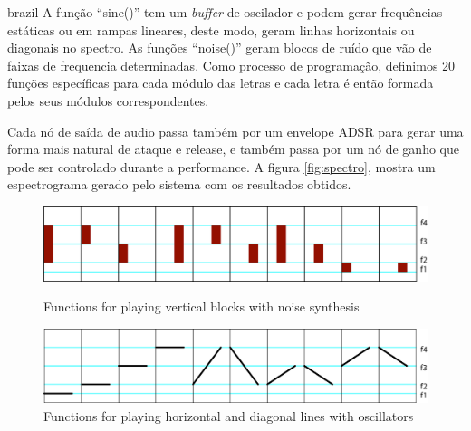 \begin{otherlanguage*}{brazil}
A função ``sine()'' tem um \emph{buffer} de oscilador e podem gerar frequências estáticas ou em rampas lineares, deste modo, geram linhas horizontais ou diagonais no spectro. As funções ``noise()'' geram blocos de ruído que vão de faixas de frequencia determinadas. Como processo de programação, definimos 20 funções específicas para cada módulo das letras e cada letra é então formada pelos seus módulos correspondentes. 






Cada nó de saída de audio passa também por um envelope ADSR \cite{Lee2016} para gerar uma forma mais natural de ataque e release, e também passa por um nó de ganho que pode ser controlado durante a performance. A figura \ref{fig:spectro}, mostra um espectrograma gerado pelo sistema com os resultados obtidos.


\begin{figure}[!ht]
    \centering
        \includegraphics[width=1\textwidth]{pictures/audiotype_v1_noise}
        \vspace{-10pt}
    \caption{Functions for playing vertical blocks with noise synthesis}
    \vspace{10pt}
    \label{fig:noise}
        \centering
        \includegraphics[width=1\textwidth]{pictures/audiotype_v1_sine}
    \caption{Functions for playing horizontal and diagonal lines with oscillators}
    \vspace{-10pt}
    \label{fig:sine}
\vspace{10pt}
\end{figure}


\end{otherlanguage*}
